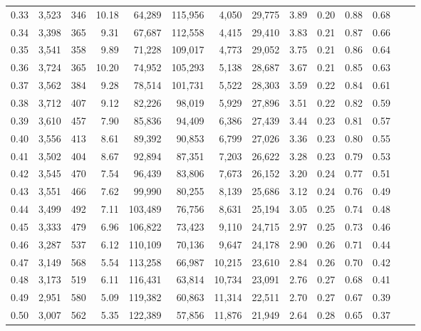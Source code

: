 \begin{tabular}{rrrrrrrrrrrrrr}
0.33 &  3,523 &  346 &   10.18 &   64,289 &  115,956 &   4,050 &  29,775 &  3.89 &  0.20 &  0.88 &      0.68 \\
0.34 &  3,398 &  365 &    9.31 &   67,687 &  112,558 &   4,415 &  29,410 &  3.83 &  0.21 &  0.87 &      0.66 \\
0.35 &  3,541 &  358 &    9.89 &   71,228 &  109,017 &   4,773 &  29,052 &  3.75 &  0.21 &  0.86 &      0.64 \\
0.36 &  3,724 &  365 &   10.20 &   74,952 &  105,293 &   5,138 &  28,687 &  3.67 &  0.21 &  0.85 &      0.63 \\
0.37 &  3,562 &  384 &    9.28 &   78,514 &  101,731 &   5,522 &  28,303 &  3.59 &  0.22 &  0.84 &      0.61 \\
0.38 &  3,712 &  407 &    9.12 &   82,226 &   98,019 &   5,929 &  27,896 &  3.51 &  0.22 &  0.82 &      0.59 \\
0.39 &  3,610 &  457 &    7.90 &   85,836 &   94,409 &   6,386 &  27,439 &  3.44 &  0.23 &  0.81 &      0.57 \\
0.40 &  3,556 &  413 &    8.61 &   89,392 &   90,853 &   6,799 &  27,026 &  3.36 &  0.23 &  0.80 &      0.55 \\
0.41 &  3,502 &  404 &    8.67 &   92,894 &   87,351 &   7,203 &  26,622 &  3.28 &  0.23 &  0.79 &      0.53 \\
0.42 &  3,545 &  470 &    7.54 &   96,439 &   83,806 &   7,673 &  26,152 &  3.20 &  0.24 &  0.77 &      0.51 \\
0.43 &  3,551 &  466 &    7.62 &   99,990 &   80,255 &   8,139 &  25,686 &  3.12 &  0.24 &  0.76 &      0.49 \\
0.44 &  3,499 &  492 &    7.11 &  103,489 &   76,756 &   8,631 &  25,194 &  3.05 &  0.25 &  0.74 &      0.48 \\
0.45 &  3,333 &  479 &    6.96 &  106,822 &   73,423 &   9,110 &  24,715 &  2.97 &  0.25 &  0.73 &      0.46 \\
0.46 &  3,287 &  537 &    6.12 &  110,109 &   70,136 &   9,647 &  24,178 &  2.90 &  0.26 &  0.71 &      0.44 \\
0.47 &  3,149 &  568 &    5.54 &  113,258 &   66,987 &  10,215 &  23,610 &  2.84 &  0.26 &  0.70 &      0.42 \\
0.48 &  3,173 &  519 &    6.11 &  116,431 &   63,814 &  10,734 &  23,091 &  2.76 &  0.27 &  0.68 &      0.41 \\
0.49 &  2,951 &  580 &    5.09 &  119,382 &   60,863 &  11,314 &  22,511 &  2.70 &  0.27 &  0.67 &      0.39 \\
0.50 &  3,007 &  562 &    5.35 &  122,389 &   57,856 &  11,876 &  21,949 &  2.64 &  0.28 &  0.65 &      0.37 \\

\end{tabular}

